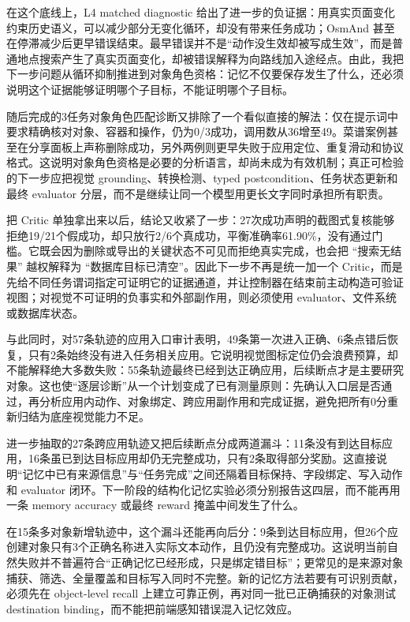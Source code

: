 \documentclass[12pt,a4paper]{ctexart}
\begin{document}
在这个底线上，L4 matched diagnostic 给出了进一步的负证据：用真实页面变化约束历史语义，可以减少部分无变化循环，却没有带来任务成功；OsmAnd 甚至在停滞减少后更早错误结束。最早错误并不是“动作没生效却被写成生效”，而是普通地点搜索产生了真实页面变化，却被错误解释为向路线加入途经点。由此，我把下一步问题从循环抑制推进到对象角色资格：记忆不仅要保存发生了什么，还必须说明这个证据能够证明哪个子目标，不能证明哪个子目标。

随后完成的3任务对象角色匹配诊断又排除了一个看似直接的解法：仅在提示词中要求精确核对对象、容器和操作，仍为0/3成功，调用数从36增至49。菜谱案例甚至在分享面板上声称删除成功，另外两例则更早失败于应用定位、重复滑动和协议格式。这说明对象角色资格是必要的分析语言，却尚未成为有效机制；真正可检验的下一步应把视觉 grounding、转换检测、typed postcondition、任务状态更新和最终 evaluator 分层，而不是继续让同一个模型用更长文字同时承担所有职责。

把 Critic 单独拿出来以后，结论又收紧了一步：27次成功声明的截图式复核能够拒绝19/21个假成功，却只放行2/6个真成功，平衡准确率61.90\%，没有通过门槛。它既会因为删除或导出的关键状态不可见而拒绝真实完成，也会把 ``搜索无结果'' 越权解释为 ``数据库目标已清空''。因此下一步不再是统一加一个 Critic，而是先给不同任务谓词指定可证明它的证据通道，并让控制器在结束前主动构造可验证视图；对视觉不可证明的负事实和外部副作用，则必须使用 evaluator、文件系统或数据库状态。

与此同时，对57条轨迹的应用入口审计表明，49条第一次进入正确、6条点错后恢复，只有2条始终没有进入任务相关应用。它说明视觉图标定位仍会浪费预算，却不能解释绝大多数失败：55条轨迹最终已经到达正确应用，后续断点才是主要研究对象。这也使“逐层诊断”从一个计划变成了已有测量原则：先确认入口层是否通过，再分析应用内动作、对象绑定、跨应用副作用和完成证据，避免把所有0分重新归结为底座视觉能力不足。

进一步抽取的27条跨应用轨迹又把后续断点分成两道漏斗：11条没有到达目标应用，16条虽已到达目标应用却仍无完整成功，只有2条取得部分奖励。这直接说明“记忆中已有来源信息”与“任务完成”之间还隔着目标保持、字段绑定、写入动作和 evaluator 闭环。下一阶段的结构化记忆实验必须分别报告这四层，而不能再用一条 memory accuracy 或最终 reward 掩盖中间发生了什么。

在15条多对象新增轨迹中，这个漏斗还能再向后分：9条到达目标应用，但26个应创建对象只有3个正确名称进入实际文本动作，且仍没有完整成功。这说明当前自然失败并不普遍符合“正确记忆已经形成，只是绑定错目标”；更常见的是来源对象捕获、筛选、全量覆盖和目标写入同时不完整。新的记忆方法若要有可识别贡献，必须先在 object-level recall 上建立可靠正例，再对同一批已正确捕获的对象测试 destination binding，而不能把前端感知错误混入记忆效应。
\end{document}
